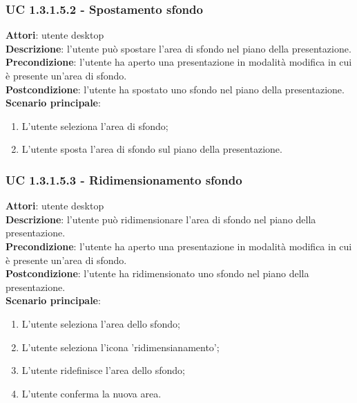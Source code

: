 \subsubsection{UC 1.3.1.5.2 - Spostamento sfondo}{
	\label{uc1.3.1.5.2}
	\textbf{Attori}: utente desktop \\
	\textbf{Descrizione}: l'utente può spostare l'area di sfondo nel piano della presentazione. \\
	\textbf{Precondizione}: l'utente ha aperto una presentazione in modalità modifica in cui è presente un'area di sfondo.	\\
	\textbf{Postcondizione}: l'utente ha spostato uno sfondo nel piano della presentazione.	\\
	\textbf{Scenario principale}:
	\begin{enumerate}
		\item L'utente seleziona l'area di sfondo;
		\item L'utente sposta l'area di sfondo sul piano della presentazione.
	\end{enumerate}
}
\subsubsection{UC 1.3.1.5.3 - Ridimensionamento sfondo}{
	\label{uc1.3.1.5.3}
	\textbf{Attori}: utente desktop \\
	\textbf{Descrizione}: l'utente può ridimensionare l'area di sfondo nel piano della presentazione. \\
	\textbf{Precondizione}: l'utente ha aperto una presentazione in modalità modifica in cui è presente un'area di sfondo.	\\
	\textbf{Postcondizione}: l'utente ha ridimensionato uno sfondo nel piano della presentazione.	\\
	\textbf{Scenario principale}:
	\begin{enumerate}
		\item L'utente seleziona l'area dello sfondo;
		\item L'utente seleziona l'icona 'ridimensianamento';
		\item L'utente ridefinisce l'area dello sfondo;
		\item L'utente conferma la nuova area.
	\end{enumerate}
}

